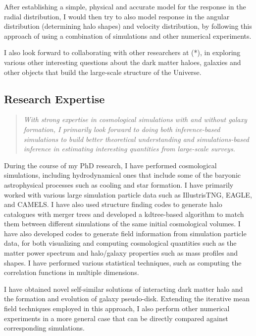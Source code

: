 \documentclass[12pt]{article}
\begin{document}
After establishing a simple, physical and accurate model for the response in the radial distribution, I would then try to also model response in the angular distribution (determining halo shapes) and velocity distribution, by following this approach of using a combination of simulations and other numerical experiments.

I also look forward to collaborating with other researchers at (*), in exploring various other interesting questions about the dark matter haloes, galaxies and other objects that build the large-scale structure of the Universe.

\subsection{Research Expertise}

\begin{quote}
    \textit{With strong expertise in cosmological simulations with and without galaxy formation, I primarily look forward to doing both inference-based simulations to build better theoretical understanding and simulations-based inference in estimating interesting quantities from large-scale surveys.}
\end{quote}

During the course of my PhD research, I have performed cosmological simulations, including hydrodynamical ones that include some of the baryonic astrophysical processes such as cooling and star formation. I have primarily worked with various large simulation particle data such as IllustrisTNG, EAGLE, and CAMELS. I have also used structure finding codes to generate halo catalogues with merger trees and developed a kdtree-based algorithm to match them between different simulations of the same initial cosmological volumes. I have also developed codes to generate field information from simulation particle data, for both visualizing and computing cosmological quantities such as the matter power spectrum and halo/galaxy properties such as mass profiles and shapes. I have performed various statistical techniques, such as computing the correlation functions in multiple dimensions. 

I have obtained novel self-similar solutions of interacting dark matter halo and the formation and evolution of galaxy pseudo-disk. Extending the iterative mean field techniques employed in this approach, I also perform other numerical experiments in a more general case that can be directly compared against corresponding simulations.
\end{document}
